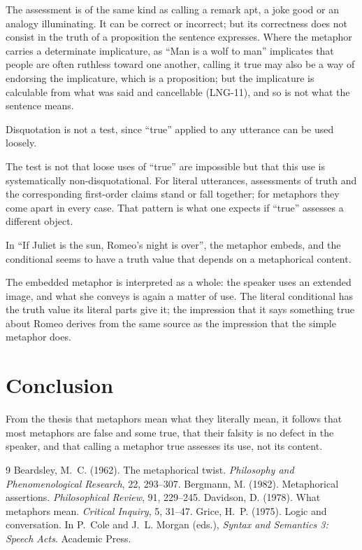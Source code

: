 \documentclass{situationist-preprint}
\begin{document}
The assessment is of the same kind as calling a remark apt, a joke good or an analogy illuminating. It can be correct or incorrect; but its correctness does not consist in the truth of a proposition the sentence expresses. Where the metaphor carries a determinate implicature, as \enquote{Man is a wolf to man} implicates that people are often ruthless toward one another, calling it true may also be a way of endorsing the implicature, which is a proposition; but the implicature is calculable from what was said and cancellable (LNG-11), and so is not what the sentence means.

\begin{objection}
Disquotation is not a test, since \enquote{true} applied to any utterance can be used loosely.
\end{objection}

\begin{reply}
The test is not that loose uses of \enquote{true} are impossible but that this use is systematically non-disquotational. For literal utterances, assessments of truth and the corresponding first-order claims stand or fall together; for metaphors they come apart in every case. That pattern is what one expects if \enquote{true} assesses a different object.
\end{reply}

\begin{objection}
In \enquote{If Juliet is the sun, Romeo's night is over}, the metaphor embeds, and the conditional seems to have a truth value that depends on a metaphorical content.
\end{objection}

\begin{reply}
The embedded metaphor is interpreted as a whole: the speaker uses an extended image, and what she conveys is again a matter of use. The literal conditional has the truth value its literal parts give it; the impression that it says something true about Romeo derives from the same source as the impression that the simple metaphor does.
\end{reply}

\section{Conclusion}

From the thesis that metaphors mean what they literally mean, it follows that most metaphors are false and some true, that their falsity is no defect in the speaker, and that calling a metaphor true assesses its use, not its content.

\begin{thebibliography}{9}\small
{} Beardsley, M.~C. (1962). The metaphorical twist. \emph{Philosophy and Phenomenological Research}, 22, 293--307.
 Bergmann, M. (1982). Metaphorical assertions. \emph{Philosophical Review}, 91, 229--245.
 Davidson, D. (1978). What metaphors mean. \emph{Critical Inquiry}, 5, 31--47.
 Grice, H.~P. (1975). Logic and conversation. In P.~Cole and J.~L. Morgan (eds.), \emph{Syntax and Semantics 3: Speech Acts}. Academic Press.
\end{thebibliography}
\end{document}
